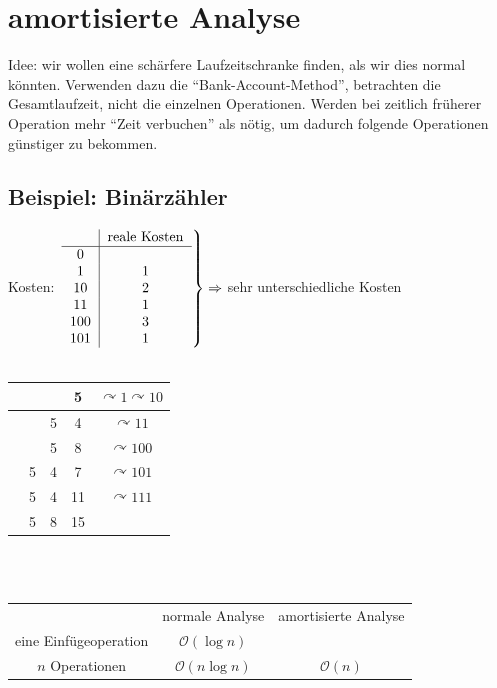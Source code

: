 \documentclass{scrartcl}
\begin{document}

\section{amortisierte Analyse}
Idee: wir wollen eine schärfere Laufzeitschranke finden, als wir dies normal könnten. Verwenden dazu die "`Bank-Account-Method"', betrachten die Gesamtlaufzeit, nicht die einzelnen Operationen. Werden bei zeitlich früherer Operation mehr "`Zeit verbuchen"' als nötig, um dadurch folgende Operationen günstiger zu bekommen.
\subsection{Beispiel: Binärzähler}
Kosten: $\left.
\begin{tabular}{c|c}
	 & reale Kosten \\
	\hline
	0 & \\
	1 & 1 \\
	10 & 2 \\
	11 & 1 \\
	100 & 3 \\
	101 & 1
\end{tabular} \right\rbrace \Rightarrow$ sehr unterschiedliche Kosten \\
\vspace*{2ex} \\
\begin{tabular}{|c|c|c|c|c}
\hline
   &   &   & 5 & $\curvearrowright 1 \curvearrowright 10$ \\
\hline
   &   & 5 & 4 & $\curvearrowright 11$ \\
\hline
   &   & 5 & 8 & $\curvearrowright 100$ \\
\hline
   & 5 & 4 & 7 & $\curvearrowright 101$ \\
\hline
   & 5 & 4 & 11 & $\curvearrowright 111$ \\
\hline
   & 5 & 8 & 15 & \\
\hline
\end{tabular}
\\ \vspace{2ex} \\
\begin{tabular}{c|c|c}
 & normale Analyse & amortisierte Analyse \\
eine Einfügeoperation & $\mathcal O(\log n)$ & \\
$n$ Operationen & $\mathcal O(n\log n)$ & $\mathcal O(n)$
\end{tabular}
\end{document}
